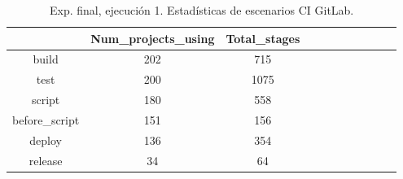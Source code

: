 \begin{table}[h]
  \centering
  \caption{Exp. final, ejecución 1. Estadísticas de escenarios CI GitLab.}
  \label{tab:tabla_f1_9}

\begin{footnotesize}
\renewcommand{\arraystretch}{1.5} %
\begin{tabular}{ccccccccccc}
  \hline
  {} &  Num\_projects\_using &  Total\_stages \\
  \hline
  build                      &                 202 &           715 \\
  test                       &                 200 &          1075 \\
  script                     &                 180 &           558 \\
  before\_script              &                 151 &           156 \\
  deploy                     &                 136 &           354 \\
  release                    &                  34 &            64 \\

\end{tabular}
\end{footnotesize}
\end{table}
